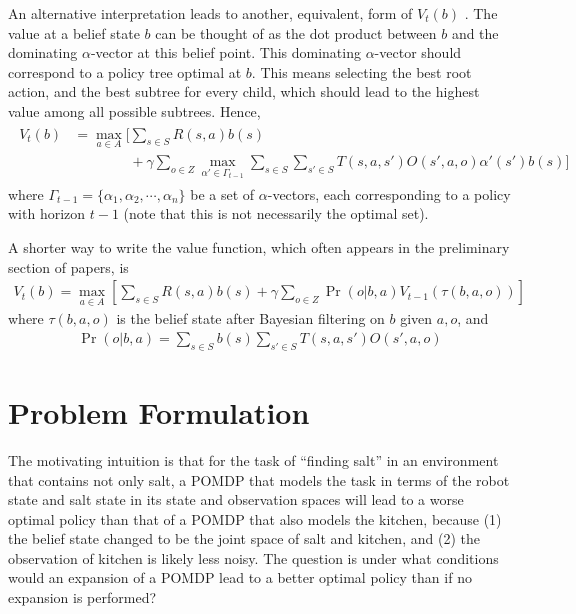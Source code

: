 \documentclass{article}
\begin{document}
An alternative interpretation leads to another, equivalent, form of $V_t(b)$ \cite{pineau2003point}. The value at a belief state $b$ can be thought of as the dot product between $b$ and the dominating $\alpha$-vector at this belief point. This dominating $\alpha$-vector should correspond to a policy tree optimal at $b$. This means selecting the best root action, and the best subtree for every child, which should lead to the highest value among all possible subtrees. Hence,
\begin{align}
\begin{split}
V_t(b) &= \max_{a\in A} \Bigg[ \sum_{s\in S} R(s,a)b(s)\\
&\qquad\qquad+ \gamma \sum_{o\in Z} \max_{\alpha'\in \Gamma_{t-1}} \sum_{s\in S} \sum_{s'\in S} T(s,a,s')O(s',a,o)\alpha'(s')b(s)  \Bigg]
\end{split}
\end{align}
where $\Gamma_{t-1}=\{\alpha_1,\alpha_2,\cdots,\alpha_n\}$ be a set of $\alpha$-vectors, each corresponding to a policy with horizon $t-1$ (note that this is not necessarily the optimal set).

A shorter way to write the value function, which often appears in the preliminary section of papers, is \cite{lee2007makes}
\begin{align}
V_t(b) = \max_{a\in A}\left[ \sum_{s\in S} R(s,a)b(s) + \gamma \sum_{o\in Z} \Pr(o | b,a) V_{t-1}(\tau(b,a,o))   \right]
\end{align}
where $\tau(b,a,o)$ is the belief state after Bayesian filtering on $b$ given $a,o$, and
\begin{align}
\Pr(o | b,a) = \sum_{s\in S}b(s)\sum_{s'\in S}T(s,a,s')O(s',a,o)
\end{align}






\section{Problem Formulation}

The motivating intuition is that for the task of ``finding salt'' in an environment that contains not only salt, a POMDP that models the task in terms of the robot state and salt state in its state and observation spaces will lead to a worse optimal policy than that of a POMDP that also models the kitchen, because (1) the belief state changed to be the joint space of salt and kitchen, and (2) the observation of kitchen is likely less noisy.  The question is under what conditions would an expansion of a POMDP lead to a better optimal policy than if no expansion is performed?
\end{document}
